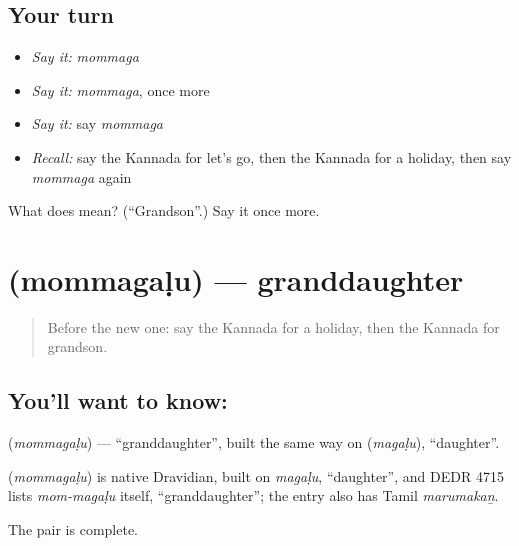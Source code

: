 \subsection*{Your turn}
\begin{itemize}
\raggedright
  \item \emph{Say it:} \emph{mommaga}
  \item \emph{Say it:} \emph{mommaga}, once more
  \item \emph{Say it:} say \emph{mommaga}
  \item \emph{Recall:} say the Kannada for let's go, then the Kannada for a holiday, then say \emph{mommaga} again
\end{itemize}

\begin{tcolorbox}[breakable,colback=teal!4,colframe=teal!35!black,title={Before you move on}]
What does  mean? (\textquotedblleft{}Grandson\textquotedblright{}.) Say it once more.
\end{tcolorbox}
\section[\texorpdfstring{\kn{ಮೊಮ್ಮಗಳು} (mommagaḷu)}{ಮೊಮ್ಮಗಳು (mommagaḷu)}]{ (mommagaḷu) — granddaughter}

\label{lesson:KA-C90-granddaughter}



\begin{quote}
Before the new one: say the Kannada for a holiday, then the Kannada for grandson.
\end{quote}

\subsection*{You'll want to know: }
\textbf{} (\emph{mommagaḷu}) — \textquotedblleft{}granddaughter\textquotedblright{}, built the same way on \textbf{} (\emph{magaḷu}), \textquotedblleft{}daughter\textquotedblright{}.

\begin{cousinweb}
\textbf{} (\emph{mommagaḷu}) is native Dravidian, built on \emph{magaḷu}, \textquotedblleft{}daughter\textquotedblright{}, and DEDR 4715 lists \emph{mom-magaḷu} itself, \textquotedblleft{}granddaughter\textquotedblright{}; the entry also has Tamil \emph{marumakaṉ}.
\end{cousinweb}

\begin{grammarlens}[title={What you've built}]
The pair is complete.
\end{grammarlens}

